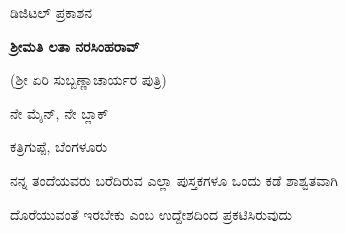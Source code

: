 \thispagestyle{empty}







{
\begin{center}

ಡಿಜಿಟಲ್ ಪ್ರಕಾಶನ 

\bigskip

\bigskip

{\bf ಶ್ರೀಮತಿ ಲತಾ ನರಸಿಂಹರಾವ್}

(ಶ್ರೀ ಏರಿ ಸುಬ್ಬಣ್ಣಾಚಾರ್ಯರ ಪುತ್ರಿ)

ನೇ ಮೈನ್, ನೇ ಬ್ಲಾಕ್

ಕತ್ರಿಗುಪ್ಪೆ, ಬೆಂಗಳೂರು 

\bigskip

{\small ನನ್ನ ತಂದೆಯವರು ಬರೆದಿರುವ ಎಲ್ಲಾ ಪುಸ್ತಕಗಳೂ ಒಂದು ಕಡೆ ಶಾಶ್ವತವಾಗಿ}

{\small ದೊರೆಯುವಂತೆ ಇರಬೇಕು ಎಂಬ ಉದ್ದೇಶದಿಂದ ಪ್ರಕಟಿಸಿರುವುದು}

\end{center}

}

